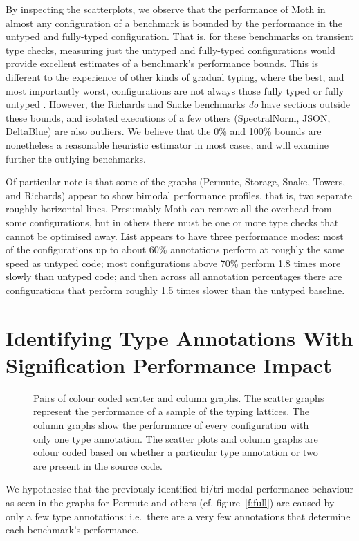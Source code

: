 \documentclass[sigplan,10pt,review,screen]{acmart}\settopmatter{printfolios=true}
\begin{document}
By inspecting the scatterplots, we observe that the performance of
Moth in almost any configuration of a benchmark is bounded by
the performance in the untyped and fully-typed configuration.
That is, for these benchmarks on transient type checks,
measuring just the untyped and fully-typed configurations
would provide excellent estimates of a benchmark's
performance bounds.  This is different to the experience
of other kinds of gradual typing, where the best, and most
importantly worst, configurations are not always those
fully typed or fully untyped \cite{Greenman2019jfp}.
%
However, the Richards and Snake benchmarks \textit{do} have
sections outside these bounds, and isolated executions of
a few others (SpectralNorm, JSON, DeltaBlue) are also outliers.
%
We believe that the 0\% and 100\% bounds are nonetheless a
reasonable heuristic estimator in most cases, and will
examine further the outlying benchmarks.


Of particular note is that some of the graphs (Permute, Storage, Snake, Towers, and Richards) appear to show bimodal performance profiles, that is, two separate roughly-horizontal lines. Presumably Moth can remove all the overhead from some configurations, but in others there must be one or more type checks that cannot be optimised away. List appears to have three performance modes: most of the configurations up to about 60\% annotations perform at roughly the same speed as untyped code; most configurations above 70\% perform 1.8 times more slowly than untyped code; and then across all annotation percentages there are configurations that perform roughly 1.5 times slower than the untyped baseline.



\section{Identifying Type Annotations With Signification Performance Impact}
\label{s-individual}
\begin{figure*}
	
	\caption{Pairs of colour coded scatter and column graphs. The scatter graphs represent the performance of a sample of the typing lattices. The column graphs show the performance of every configuration with only one type annotation. The scatter plots and column graphs are colour coded based on whether a particular type annotation or two are present in the source code.}
	\label{f:pattern}		
\end{figure*}

We hypothesise that the previously identified bi/tri-modal performance behaviour
as seen in the graphs for Permute and others (cf. figure~\ref{f:full}) are caused by only a few type annotations: i.e.\ there are a very few annotations that determine each benchmark's performance.
\end{document}
